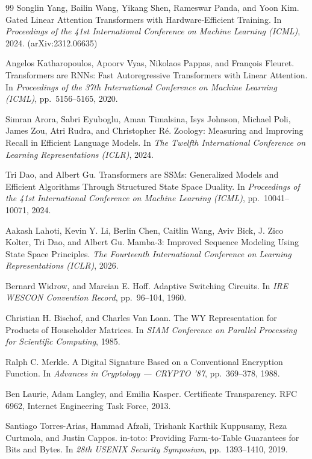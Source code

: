 \documentclass[11pt]{article}
\begin{document}
\begin{thebibliography}{99}
 Songlin Yang, Bailin Wang, Yikang Shen, Rameswar Panda, and Yoon Kim. Gated Linear Attention Transformers with Hardware-Efficient Training. In \emph{Proceedings of the 41st International Conference on Machine Learning (ICML)}, 2024. (arXiv:2312.06635)

 Angelos Katharopoulos, Apoorv Vyas, Nikolaos Pappas, and Fran{\c{c}}ois Fleuret. Transformers are {RNN}s: Fast Autoregressive Transformers with Linear Attention. In \emph{Proceedings of the 37th International Conference on Machine Learning (ICML)}, pp.~5156--5165, 2020.

 Simran Arora, Sabri Eyuboglu, Aman Timalsina, Isys Johnson, Michael Poli, James Zou, Atri Rudra, and Christopher R{\'e}. Zoology: Measuring and Improving Recall in Efficient Language Models. In \emph{The Twelfth International Conference on Learning Representations (ICLR)}, 2024.

 Tri Dao, and Albert Gu. Transformers are {SSM}s: Generalized Models and Efficient Algorithms Through Structured State Space Duality. In \emph{Proceedings of the 41st International Conference on Machine Learning (ICML)}, pp.~10041--10071, 2024.

 Aakash Lahoti, Kevin Y. Li, Berlin Chen, Caitlin Wang, Aviv Bick, J. Zico Kolter, Tri Dao, and Albert Gu. Mamba-3: Improved Sequence Modeling Using State Space Principles. \emph{The Fourteenth International Conference on Learning Representations (ICLR)}, 2026.

 Bernard Widrow, and Marcian E. Hoff. Adaptive Switching Circuits. In \emph{IRE WESCON Convention Record}, pp.~96--104, 1960.

 Christian H. Bischof, and Charles Van Loan. The {WY} Representation for Products of Householder Matrices. In \emph{SIAM Conference on Parallel Processing for Scientific Computing}, 1985.

 Ralph C. Merkle. A Digital Signature Based on a Conventional Encryption Function. In \emph{Advances in Cryptology --- CRYPTO '87}, pp.~369--378, 1988.

 Ben Laurie, Adam Langley, and Emilia Kasper. Certificate Transparency. RFC 6962, Internet Engineering Task Force, 2013.

 Santiago Torres-Arias, Hammad Afzali, Trishank Karthik Kuppusamy, Reza Curtmola, and Justin Cappos. in-toto: Providing Farm-to-Table Guarantees for Bits and Bytes. In \emph{28th USENIX Security Symposium}, pp.~1393--1410, 2019.


\end{thebibliography}
\end{document}
